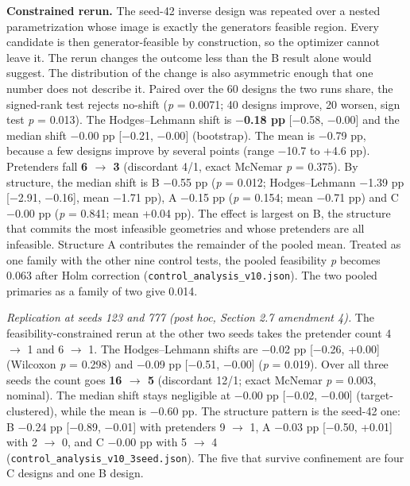 \documentclass[11pt,a4paper]{article}
\begin{document}
\textbf{Constrained rerun.} The seed-42 inverse design was repeated over a nested
parametrization whose image is exactly the generator\textquotesingle s feasible region. Every candidate is
then generator-feasible by construction, so the optimizer cannot leave it. The rerun
changes the outcome less than the B result alone would suggest. The distribution of the
change is also asymmetric enough that one number does not describe it. Paired over the 60
designs the two runs share, the signed-rank test rejects no-shift (\emph{p} = 0.0071; 40
designs improve, 20 worsen, sign test \emph{p} = 0.013). The Hodges--Lehmann shift is
\textbf{\ensuremath{-}0.18 pp} {[}\ensuremath{-}0.58, \ensuremath{-}0.00{]} and the median shift \ensuremath{-}0.00 pp {[}\ensuremath{-}0.21, \ensuremath{-}0.00{]} (bootstrap). The
mean is \ensuremath{-}0.79 pp, because a few designs improve by several points (range \ensuremath{-}10.7 to
+4.6 pp). Pretenders fall \textbf{6 \ensuremath{\rightarrow} 3} (discordant 4/1, exact McNemar \emph{p} = 0.375). By
structure, the median shift is B \ensuremath{-}0.55 pp (\emph{p} = 0.012; Hodges--Lehmann \ensuremath{-}1.39 pp
{[}\ensuremath{-}2.91, \ensuremath{-}0.16{]}, mean \ensuremath{-}1.71 pp), A \ensuremath{-}0.15 pp (\emph{p} = 0.154; mean \ensuremath{-}0.71 pp) and C \ensuremath{-}0.00 pp
(\emph{p} = 0.841; mean +0.04 pp). The effect is largest on B, the structure that commits the
most infeasible geometries and whose pretenders are all infeasible. Structure A
contributes the remainder of the pooled mean. Treated as one family with the other nine
control tests, the pooled feasibility \emph{p} becomes 0.063 after Holm correction
(\texttt{control\_\allowbreak{}analysis\_\allowbreak{}v10.\allowbreak{}json}). The two pooled primaries as a family of two give 0.014.

\emph{Replication at seeds 123 and 777 (post hoc, Section 2.7 amendment 4).} The
feasibility-constrained rerun at the other two seeds takes the pretender count 4 \ensuremath{\rightarrow} 1 and
6 \ensuremath{\rightarrow} 1. The Hodges--Lehmann shifts are \ensuremath{-}0.02 pp {[}\ensuremath{-}0.26, +0.00{]} (Wilcoxon \emph{p} = 0.298) and
\ensuremath{-}0.09 pp {[}\ensuremath{-}0.51, \ensuremath{-}0.00{]} (\emph{p} = 0.019). Over all three seeds the count goes \textbf{16 \ensuremath{\rightarrow} 5}
(discordant 12/1; exact McNemar \emph{p} = 0.003, nominal). The median shift stays negligible
at \ensuremath{-}0.00 pp {[}\ensuremath{-}0.02, \ensuremath{-}0.00{]} (target-clustered), while the mean is \ensuremath{-}0.60 pp. The structure
pattern is the seed-42 one: B \ensuremath{-}0.24 pp {[}\ensuremath{-}0.89, \ensuremath{-}0.01{]} with pretenders 9 \ensuremath{\rightarrow} 1, A \ensuremath{-}0.03 pp
{[}\ensuremath{-}0.50, +0.01{]} with 2 \ensuremath{\rightarrow} 0, and C \ensuremath{-}0.00 pp with 5 \ensuremath{\rightarrow} 4 (\texttt{control\_\allowbreak{}analysis\_\allowbreak{}v10\_\allowbreak{}3seed.\allowbreak{}json}).
The five that survive confinement are four C designs and one B design.
\end{document}
